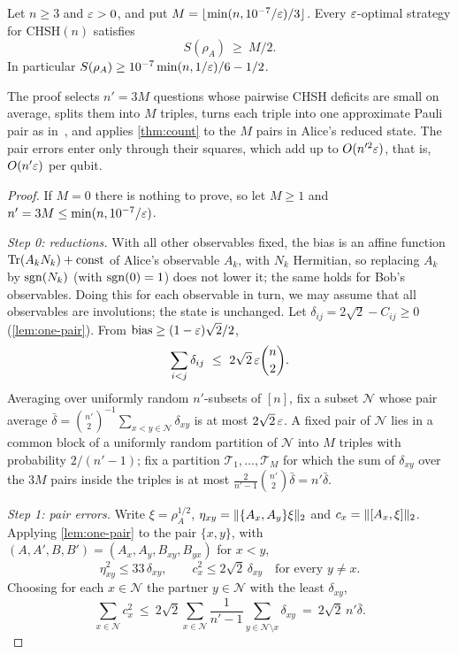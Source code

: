 \begin{theorem}\label{thm:chsh}
Let $n\ge3$ and $\varepsilon>0$, and put $M=\lfloor\min(n,10^{-7}/\varepsilon)/3\rfloor$. Every $\varepsilon$-optimal strategy for CHSH$(n)$ satisfies
\[
S(\rho_A)\ \ge\ M/2 .
\]
In particular $S(\rho_A)\ge10^{-7}\min(n,1/\varepsilon)/6-1/2$.
\end{theorem}

The proof selects $n'=3M$ questions whose pairwise CHSH deficits are small on average, splits them into $M$ triples, turns each triple
into one approximate Pauli pair as in~\cite{OV18}, and applies \cref{thm:count} to the $M$ pairs in Alice's reduced state. The pair errors
enter only through their squares, which add up to $O(n'^2\varepsilon)$, that is, $O(n'\varepsilon)$ per qubit.

\begin{proof}
If $M=0$ there is nothing to prove, so let $M\ge1$ and $n'=3M\le\min(n,10^{-7}/\varepsilon)$.

\emph{Step 0: reductions.} With all other observables fixed, the bias is an affine function $\operatorname{Tr}(A_kN_k)+\mathrm{const}$ of Alice's
observable $A_k$, with $N_k$ Hermitian, so replacing $A_k$ by $\operatorname{sgn}(N_k)$ (with $\operatorname{sgn}(0)=1$) does not lower it; the same holds for Bob's
observables. Doing this for each observable in turn, we may assume that all observables are involutions; the state is unchanged. Let
$\delta_{ij}=2\sqrt2-C_{ij}\ge0$ (\cref{lem:one-pair}). From $\operatorname{bias}\ge(1-\varepsilon)\sqrt2/2$,
\[
\sum_{i<j}\delta_{ij}\ \le\ 2\sqrt2\,\eps\binom n2 .
\]
Averaging over uniformly random $n'$-subsets of $[n]$, fix a subset $\mathcal N$ whose pair average
$\bar\delta=\binom{n'}2^{-1}\sum_{x<y\in\mathcal N}\delta_{xy}$ is at most $2\sqrt2\,\varepsilon$. A fixed pair of $\mathcal N$ lies in a common block of a
uniformly random partition of $\mathcal N$ into $M$ triples with probability $2/(n'-1)$; fix a partition $\mathcal T_1,\dots,\mathcal T_M$
for which the sum of $\delta_{xy}$ over the $3M$ pairs inside the triples is at most $\frac2{n'-1}\binom{n'}2\bar\delta=n'\bar\delta$.

\emph{Step 1: pair errors.} Write $\xi=\rho_A^{1/2}$, $\eta_{xy}=\lVert \{A_x,A_y\}\xi\rVert_2$ and $c_x=\lVert [A_x,\xi]\rVert_2$. Applying \cref{lem:one-pair}
to the pair $\{x,y\}$, with $(A,A',B,B')=(A_x,A_y,B_{xy},B_{yx})$ for $x<y$,
\[
\eta_{xy}^2\le33\,\delta_{xy},\qquad c_x^2\le2\sqrt2\,\delta_{xy}\quad\text{for every }y\ne x.
\]
Choosing for each $x\in\mathcal N$ the partner $y\in\mathcal N$ with the least $\delta_{xy}$,
\[
\sum_{x\in\mathcal N}c_x^2\ \le\ 2\sqrt2\sum_{x\in\mathcal N}\frac1{n'-1}\sum_{y\in\mathcal N\setminus x}\delta_{xy}\ =\ 2\sqrt2\,n'\bar\delta .
\]


\end{proof}
